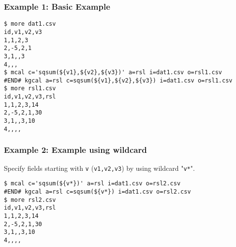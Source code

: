 \subsubsection*{Example 1: Basic Example}



\begin{Verbatim}[baselinestretch=0.7,frame=single]
$ more dat1.csv
id,v1,v2,v3
1,1,2,3
2,-5,2,1
3,1,,3
4,,,
$ mcal c='sqsum(${v1},${v2},${v3})' a=rsl i=dat1.csv o=rsl1.csv
#END# kgcal a=rsl c=sqsum(${v1},${v2},${v3}) i=dat1.csv o=rsl1.csv
$ more rsl1.csv
id,v1,v2,v3,rsl
1,1,2,3,14
2,-5,2,1,30
3,1,,3,10
4,,,,
\end{Verbatim}
\subsubsection*{Example 2: Example using wildcard}

Specify fields starting with \verb|v| (\verb|v1,v2,v3|) by using wildcard "\verb|v*|".


\begin{Verbatim}[baselinestretch=0.7,frame=single]
$ mcal c='sqsum(${v*})' a=rsl i=dat1.csv o=rsl2.csv
#END# kgcal a=rsl c=sqsum(${v*}) i=dat1.csv o=rsl2.csv
$ more rsl2.csv
id,v1,v2,v3,rsl
1,1,2,3,14
2,-5,2,1,30
3,1,,3,10
4,,,,
\end{Verbatim}
